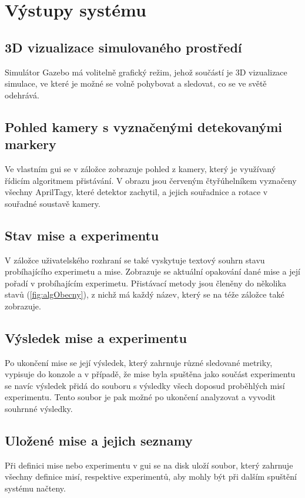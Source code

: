   \section{Výstupy systému} \label{sec:outputs}
    \subsection{3D vizualizace simulovaného prostředí}
      Simulátor Gazebo má volitelně grafický režim, jehož součástí je 3D vizualizace simulace, ve které je možné se volně pohybovat a sledovat, co se ve světě odehrává.
    \subsection{Pohled kamery s vyznačenými detekovanými markery}
      Ve vlastním \acrshort{gui} se v záložce  zobrazuje pohled z kamery, který je využívaný řídicím algoritmem přistávání. V obrazu jsou červeným čtyřúhelníkem vyznačeny všechny AprilTagy, které detektor zachytil, a jejich souřadnice a rotace v souřadné soustavě kamery.
    \subsection{Stav mise a experimentu}
      V záložce  uživatelského rozhraní se také vyskytuje textový souhrn stavu probíhajícího experimetu a mise. Zobrazuje se aktuální opakování dané mise a její pořadí v probíhajícím experimetu. Přistávací metody jsou členěny do několika stavů (\cref{fig:algObecny}), z nichž má každý název, který se na téže záložce také zobrazuje. %
    \subsection{Výsledek mise a experimentu}
      Po ukončení mise se její výsledek, který zahrnuje různé sledované metriky, %
      vypisuje do konzole a v případě, že mise byla spuštěna jako součást experimentu se navíc výsledek přidá do souboru s výsledky všech doposud proběhlých misí experimentu. Tento soubor je pak možné po ukončení analyzovat a vyvodit souhrnné výsledky.
    \subsection{Uložené mise a jejich seznamy}
      Při definici mise nebo experimentu v \acrshort{gui} se na disk uloží soubor, který zahrnuje všechny definice misí, respektive experimentů, aby mohly být při dalším spuštění systému načteny.

